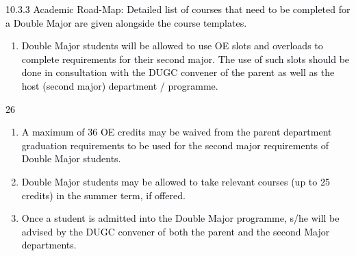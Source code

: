 \documentclass[12pt]{article}
\begin{document}
\vspace{\baselineskip}
\begin{adjustwidth}{0.0in}{0.17in}
{\fontsize{10pt}{12.0pt}\selectfont \textcolor[HTML]{00000A}{10.3.3 Academic Road-Map: Detailed list of courses that need to be completed for a Double Major are given alongside the course templates.}\par}\par

\end{adjustwidth}


\vspace{\baselineskip}
\begin{enumerate}
	\item {\fontsize{10pt}{12.0pt}\selectfont \textcolor[HTML]{00000A}{Double Major students will be allowed to use OE slots and overloads to complete requirements for their second major. The use of such slots should be done in consultation with the DUGC convener of the parent as well as the host (second major) department / programme.}\par}
\end{enumerate}\par


\vspace{\baselineskip}
\begin{Center}
\textcolor[HTML]{00000A}{26}
\end{Center}\par


\vspace{\baselineskip}
\begin{enumerate}
	\item {\fontsize{10pt}{12.0pt}\selectfont \textcolor[HTML]{00000A}{A maximum of 36 OE credits may be waived from the parent department graduation requirements to be used for the second major requirements of Double Major students.}\par}\par


\vspace{\baselineskip}
	\item {\fontsize{9pt}{10.8pt}\selectfont \textcolor[HTML]{00000A}{Double Major students may be allowed to take relevant courses (up to 25 credits) in the summer term, if offered.}\par}\par


\vspace{\baselineskip}
	\item {\fontsize{10pt}{12.0pt}\selectfont \textcolor[HTML]{00000A}{Once a student is admitted into the Double Major programme, s/he will be advised by the DUGC convener of both the parent and the second Major departments.}\par}
\end{enumerate}\par
\end{document}
